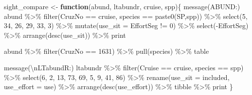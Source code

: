 \documentclass[
]{book}
\newenvironment{Shaded}{\begin{snugshade}}{\end{snugshade}}
\newcommand{\AttributeTok}[1]{\textcolor[rgb]{0.77,0.63,0.00}{#1}}
\newcommand{\ControlFlowTok}[1]{\textcolor[rgb]{0.13,0.29,0.53}{\textbf{#1}}}
\newcommand{\DecValTok}[1]{\textcolor[rgb]{0.00,0.00,0.81}{#1}}
\newcommand{\FunctionTok}[1]{\textcolor[rgb]{0.00,0.00,0.00}{#1}}
\newcommand{\NormalTok}[1]{#1}
\newcommand{\OtherTok}[1]{\textcolor[rgb]{0.56,0.35,0.01}{#1}}
\newcommand{\SpecialCharTok}[1]{\textcolor[rgb]{0.00,0.00,0.00}{#1}}
\newcommand{\StringTok}[1]{\textcolor[rgb]{0.31,0.60,0.02}{#1}}
\begin{document}
\begin{Shaded}
\begin{Highlighting}[]
\NormalTok{sight\_compare }\OtherTok{\textless{}{-}} \ControlFlowTok{function}\NormalTok{(abund, ltabundr, cruise, spp)\{}
  \FunctionTok{message}\NormalTok{(}\StringTok{\textquotesingle{}ABUND:\textquotesingle{}}\NormalTok{)}
\NormalTok{  abund }\SpecialCharTok{\%\textgreater{}\%}
    \FunctionTok{filter}\NormalTok{(CruzNo }\SpecialCharTok{==}\NormalTok{ cruise, species }\SpecialCharTok{==} \FunctionTok{paste0}\NormalTok{(}\StringTok{\textquotesingle{}SP\textquotesingle{}}\NormalTok{,spp)) }\SpecialCharTok{\%\textgreater{}\%}
    \FunctionTok{select}\NormalTok{(}\DecValTok{5}\NormalTok{, }\DecValTok{34}\NormalTok{, }\DecValTok{26}\NormalTok{, }\DecValTok{29}\NormalTok{, }\DecValTok{33}\NormalTok{, }\DecValTok{3}\NormalTok{) }\SpecialCharTok{\%\textgreater{}\%}
    \FunctionTok{mutate}\NormalTok{(}\AttributeTok{use\_sit =}\NormalTok{ EffortSeg }\SpecialCharTok{!=} \DecValTok{0}\NormalTok{) }\SpecialCharTok{\%\textgreater{}\%}
    \FunctionTok{select}\NormalTok{(}\SpecialCharTok{{-}}\NormalTok{EffortSeg) }\SpecialCharTok{\%\textgreater{}\%}
    \FunctionTok{arrange}\NormalTok{(}\FunctionTok{desc}\NormalTok{(use\_sit)) }\SpecialCharTok{\%\textgreater{}\%}
\NormalTok{    print}

\NormalTok{  abund }\SpecialCharTok{\%\textgreater{}\%}
    \FunctionTok{filter}\NormalTok{(CruzNo }\SpecialCharTok{==} \DecValTok{1631}\NormalTok{) }\SpecialCharTok{\%\textgreater{}\%} \FunctionTok{pull}\NormalTok{(species) }\SpecialCharTok{\%\textgreater{}\%}\NormalTok{ table}
  
  
  \FunctionTok{message}\NormalTok{(}\StringTok{\textquotesingle{}}\SpecialCharTok{\textbackslash{}n}\StringTok{LTabundR:\textquotesingle{}}\NormalTok{)}
\NormalTok{  ltabundr }\SpecialCharTok{\%\textgreater{}\%}
    \FunctionTok{filter}\NormalTok{(Cruise }\SpecialCharTok{==}\NormalTok{ cruise, species }\SpecialCharTok{==}\NormalTok{ spp) }\SpecialCharTok{\%\textgreater{}\%}
    \FunctionTok{select}\NormalTok{(}\DecValTok{6}\NormalTok{, }\DecValTok{2}\NormalTok{, }\DecValTok{13}\NormalTok{, }\DecValTok{73}\NormalTok{, }\DecValTok{69}\NormalTok{, }\DecValTok{5}\NormalTok{, }\DecValTok{9}\NormalTok{, }\DecValTok{41}\NormalTok{, }\DecValTok{86}\NormalTok{) }\SpecialCharTok{\%\textgreater{}\%}
    \FunctionTok{rename}\NormalTok{(}\AttributeTok{use\_sit =}\NormalTok{ included, }\AttributeTok{use\_effort =}\NormalTok{ use) }\SpecialCharTok{\%\textgreater{}\%}
    \FunctionTok{arrange}\NormalTok{(}\FunctionTok{desc}\NormalTok{(use\_effort)) }\SpecialCharTok{\%\textgreater{}\%}
\NormalTok{    tibble }\SpecialCharTok{\%\textgreater{}\%}\NormalTok{ print}
\NormalTok{\}}
\end{Highlighting}
\end{Shaded}
\end{document}
